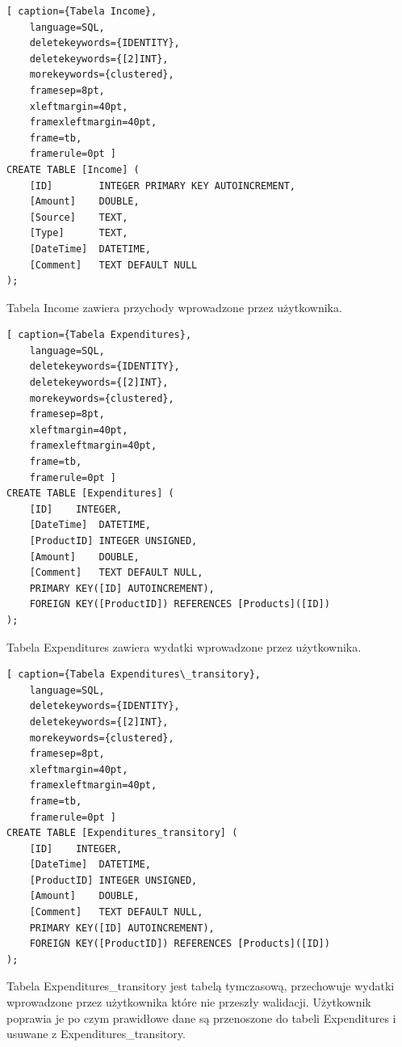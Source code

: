 \documentclass[a4paper,10pt, twoside]{report}
\begin{document}
\begin{minipage}{\textwidth}
\begin{lstlisting}[ caption={Tabela Income},
    language=SQL,
    deletekeywords={IDENTITY},
    deletekeywords={[2]INT},
    morekeywords={clustered},
    framesep=8pt,
    xleftmargin=40pt,
    framexleftmargin=40pt,
    frame=tb,
    framerule=0pt ]
CREATE TABLE [Income] (
	[ID] 		INTEGER PRIMARY KEY AUTOINCREMENT,
	[Amount]	DOUBLE,
	[Source]	TEXT,
	[Type]		TEXT,
	[DateTime]	DATETIME,
	[Comment]	TEXT DEFAULT NULL
);
\end{lstlisting}
{Tabela Income zawiera przychody wprowadzone przez użytkownika.}
\end{minipage}

\begin{minipage}{\textwidth}
\begin{lstlisting}[ caption={Tabela Expenditures},
    language=SQL,
    deletekeywords={IDENTITY},
    deletekeywords={[2]INT},
    morekeywords={clustered},
    framesep=8pt,
    xleftmargin=40pt,
    framexleftmargin=40pt,
    frame=tb,
    framerule=0pt ]
CREATE TABLE [Expenditures] (
	[ID]	INTEGER,
	[DateTime]	DATETIME,
	[ProductID]	INTEGER UNSIGNED,
	[Amount]	DOUBLE,
	[Comment]	TEXT DEFAULT NULL,
	PRIMARY KEY([ID] AUTOINCREMENT),
	FOREIGN KEY([ProductID]) REFERENCES [Products]([ID])
);
\end{lstlisting}
{Tabela Expenditures zawiera wydatki wprowadzone przez użytkownika.}
\end{minipage}

\begin{minipage}{\textwidth}
\begin{lstlisting}[ caption={Tabela Expenditures\_transitory},
    language=SQL,
    deletekeywords={IDENTITY},
    deletekeywords={[2]INT},
    morekeywords={clustered},
    framesep=8pt,
    xleftmargin=40pt,
    framexleftmargin=40pt,
    frame=tb,
    framerule=0pt ]
CREATE TABLE [Expenditures_transitory] (
	[ID]	INTEGER,
	[DateTime]	DATETIME,
	[ProductID]	INTEGER UNSIGNED,
	[Amount]	DOUBLE,
	[Comment]	TEXT DEFAULT NULL,
	PRIMARY KEY([ID] AUTOINCREMENT),
	FOREIGN KEY([ProductID]) REFERENCES [Products]([ID])
);
\end{lstlisting}
{Tabela Expenditures\_transitory jest tabelą tymczasową, przechowuje wydatki 
wprowadzone przez użytkownika które nie przeszły walidacji. Użytkownik poprawia 
je po czym prawidłowe dane są przenoszone do tabeli Expenditures i  usuwane z 
Expenditures\_transitory.}
\end{minipage}
\end{document}

